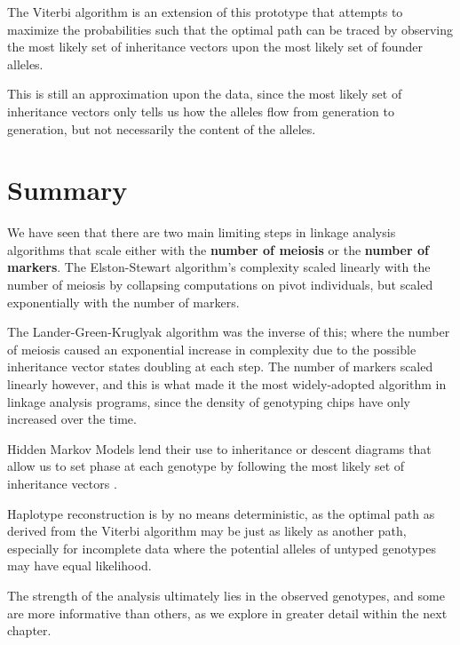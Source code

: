 The Viterbi algorithm is an extension of this prototype that attempts to maximize the probabilities such that the optimal path can be traced by observing the most likely set of inheritance vectors upon the most likely set of founder alleles.

This is still an approximation upon the data, since the most likely set of inheritance vectors only tells us how the alleles flow from generation to generation, but not necessarily the content of the alleles.





\section{Summary}


We have seen that there are two main limiting steps in linkage analysis algorithms that scale either with the \textbf{number of meiosis} or the \textbf{number of markers}. The Elston-Stewart algorithm's complexity scaled linearly with the number of meiosis by collapsing computations on pivot individuals, but scaled exponentially with the number of markers. 

The Lander-Green-Kruglyak algorithm was the inverse of this; where  the number of meiosis caused an exponential increase in complexity due to the possible inheritance vector states doubling at each step.  The number of markers scaled linearly however, and this is what made it the most widely-adopted algorithm in linkage analysis programs, since the density of genotyping chips have only increased over the time.

Hidden Markov Models lend their use to inheritance or descent diagrams that allow us to set phase at each genotype by following the most likely set of inheritance vectors \cite{sobel1996descent}.

Haplotype reconstruction is by no means deterministic, as the optimal path as derived from the Viterbi algorithm may be just as likely as another path, especially for incomplete data where the potential alleles of untyped genotypes may have equal likelihood.


The strength of the analysis ultimately lies in the observed genotypes, and some are more informative than others, as we explore in greater detail within the next chapter.



































